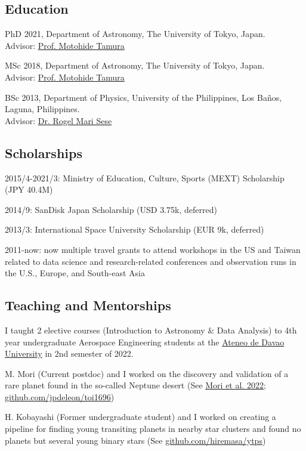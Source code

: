 \documentclass[11pt,letterpaper]{article}
\begin{document}
\subsection{Education}
\begin{list}{}{\cvlist}
    \item
          PhD 2021, Department of Astronomy, The University of Tokyo, Japan.\\Advisor: \href{\tamuraurl}{Prof. Motohide Tamura}
    \item
          MSc 2018, Department of Astronomy, The University of Tokyo, Japan.\\Advisor: \href{\tamuraurl}{Prof. Motohide Tamura}
    \item
          BSc 2013, Department of Physics, University of the Philippines, Los Ba\~nos, Laguna, Philippines.\\Advisor: \href{\seseurl}{Dr. Rogel Mari Sese}      
\end{list}

\subsection{Scholarships}
\begin{list}{}{\cvlist}
    \item 2015/4-2021/3: Ministry of Education, Culture, Sports (MEXT) Scholarship (JPY 40.4M)
    \item 2014/9: SanDisk Japan Scholarship (USD 3.75k, deferred)
    \item 2013/3: International Space University Scholarship (EUR 9k, deferred)
    \item 2011-now: now multiple travel grants to attend workshops in the US and Taiwan related to data science and research-related conferences and observation runs in the U.S., Europe, and South-east Asia
\end{list}

\subsection{Teaching and Mentorships}
\begin{list}{}{\cvlist}
    \item I taught 2 elective courses (Introduction to Astronomy \& Data Analysis) to 4th year undergraduate Aerospace Engineering students at the \href{http://sea.addu.edu.ph/programs/aerospace-engineering/}{Ateneo de Davao University} in 2nd semester of 2022. \\
    \item M. Mori (Current postdoc) and I worked on the discovery and validation of a rare planet found in the so-called Neptune desert (See \href{https://ui.adsabs.harvard.edu/abs/2022AJ....163..298M/abstract}{Mori et al. 2022}; \href{https://github.com/jpdeleon/toi1696}{github.com/jpdeleon/toi1696})
    \item H. Kobayashi (Former undergraduate student) and I worked on creating a pipeline for finding young transiting planets in nearby star clusters and found no planets but several young binary stars (See \href{https://github.com/hiremasa/ytps}{github.com/hiremasa/ytps})
\end{list}
\end{document}
